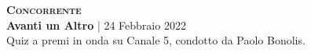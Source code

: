 \textbf{\textsc{Concorrente}} \\
\textbf{Avanti un Altro} | 24 Febbraio 2022 \\
Quiz a premi in onda su Canale 5, condotto da Paolo Bonolis.
\begin{center}
    \label{fig:avanti_un_altro}	
\end{center}